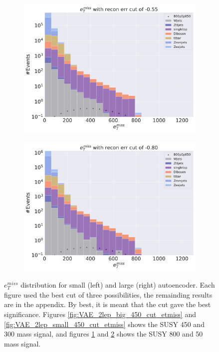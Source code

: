 \begin{figure}[H]
    \hfill
    \begin{subfigure}{.45\textwidth}
        \includegraphics[width=\textwidth]{Figures/VAE_testing/big/2lep/b_data_recon_big_rm3_feats_sig_800p0p050_recon_errcut_-0.55.pdf}
        \caption{}
        \label{fig:VAE_2lep_big_800_cut_etmiss}
    \end{subfigure}
    \hfill   
    \begin{subfigure}{.45\textwidth}
        \includegraphics[width=\textwidth]{Figures/VAE_testing/small/2lep/b_data_recon_big_rm3_feats_sig_800p0p050_recon_errcut_-0.80.pdf}
        \caption{}
        \label{fig:VAE_2lep_small_800_cut_etmiss}
    \end{subfigure}
    \hfill      
    \caption[$e_T^{miss}$ best cuts for regular autoencoder]{$e_T^{miss}$ distribution for small (left) and large (right) autoencoder.
    Each figure used the best cut of three possibilities, the remainding results are in the appendix. By best, it is meant that the cut
    gave the best significance. Figures \ref{fig:VAE_2lep_big_450_cut_etmiss} and \ref{fig:VAE_2lep_small_450_cut_etmiss} shows the SUSY 450 and 300 mass signal, 
    and figures \ref{fig:VAE_2lep_big_800_cut_etmiss} and \ref{fig:VAE_2lep_small_800_cut_etmiss} shows the SUSY 800 and 50 mass signal.}
    \label{fig:VAE_2lep_recon_err_both_sig_cut_etmiss}
\end{figure}


